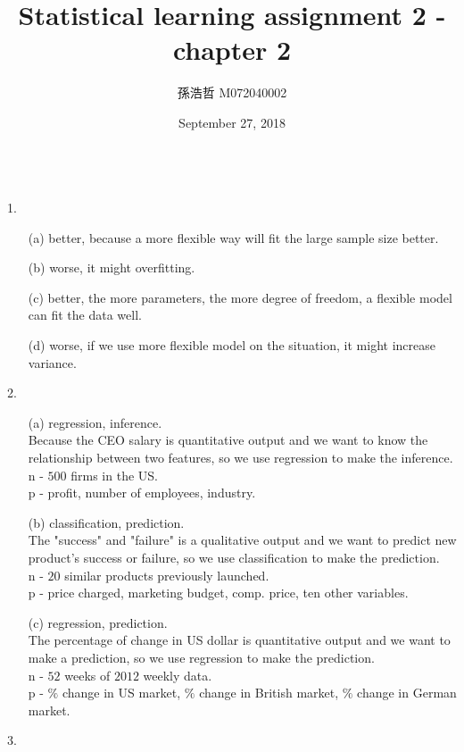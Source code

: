 \documentclass[12pt]{article}
\title{Statistical learning assignment 2 - chapter 2}
\author{孫浩哲 \hspace{0.7cm} M072040002}
\date{September 27, 2018}
\begin{document}
\maketitle
\ \\
\Large{1.}
\normalsize
\begin{itemize}
\item[\normalsize(a)]
better, because a more flexible way will fit the large sample size better.
\item[(b)]
worse, it might overfitting.
\item[(c)]
better, the more parameters, the more degree of freedom, a flexible model can fit the data well.
\item[(d)]
worse, if we use more flexible model on the situation, it might increase variance.
\end{itemize}
\Large{2.}
\begin{itemize}
\item[\normalsize(a)]
\normalsize regression, inference.\\[2ex]
Because the CEO salary is quantitative output and we want to know the relationship between two features, so we use regression to make the inference.\\[2ex]
n - $500$ firms in the US.\\
p - profit, number of employees, industry.
\item[(b)]
classification, prediction.\\[2ex]
The "success" and "failure" is a qualitative output and we want to predict new product's success or failure, so we use classification to make the prediction.\\[2ex]
n - $20$ similar products previously launched.\\
p - price charged, marketing budget, comp. price, ten other variables.
\item[(c)]
regression, prediction.\\[2ex]
The percentage of change in US dollar is quantitative output and we want to make a prediction, so we use regression to make the prediction.\\[2ex]
n - $52$ weeks of $2012$ weekly data.\\
p - $\%$ change in US market, $\%$ change in British market, $\%$ change in German market.
\end{itemize}
\Large{3.}
\normalsize
\end{document}
